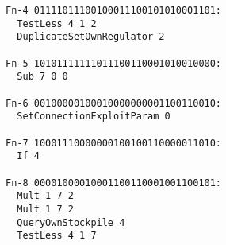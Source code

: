 \begin{verbatim}
Fn-4 01111011100100011100101010001101:
  TestLess 4 1 2
  DuplicateSetOwnRegulator 2

Fn-5 10101111111011100110001010010000:
  Sub 7 0 0

Fn-6 00100000100010000000001100110010:
  SetConnectionExploitParam 0

Fn-7 10001110000000100100110000011010:
  If 4

Fn-8 00001000010001100110001001100101:
  Mult 1 7 2
  Mult 1 7 2
  QueryOwnStockpile 4
  TestLess 4 1 7
\end{verbatim}
